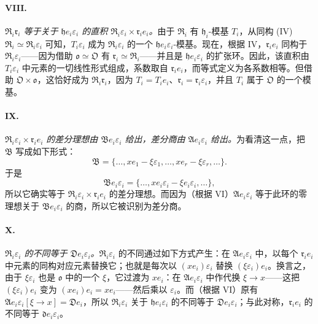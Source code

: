 \documentclass[11pt]{article}
\begin{document}
\paragraph{VIII.}
\emph{$\mathfrak R_i\mathfrak r_i$ 等于关于 $\mathfrak h e_i\varepsilon_i$ 的直积 $\mathfrak R_i\varepsilon_i\times\mathfrak r_i e_i$。}由于 $\mathfrak R_i$ 有 $\mathfrak h_i$-模基 $T_i$，从同构 (IV) $\mathfrak R_i\simeq\mathfrak R_i\varepsilon_i$ 可知，$T_i\varepsilon_i$ 成为 $\mathfrak R_i\varepsilon_i$ 的一个 $\mathfrak h e_i\varepsilon_i$-模基。现在，根据 IV，$\mathfrak r_i e_i$ 同构于 $\mathfrak R_i\varepsilon_i$——因为借助 $\mathfrak o\simeq\mathfrak O$ 有 $\mathfrak r_i\simeq\mathfrak R_i$——并且是 $\mathfrak h e_i\varepsilon_i$ 的扩张环。因此，该直积由 $T_i\varepsilon_i$ 中元素的一切线性形式组成，系数取自 $\mathfrak r_i e_i$，而等式定义为各系数相等。但借助 $\mathfrak O\times\mathfrak o$，这恰好成为 $\mathfrak R_i\mathfrak r_i$，因为 $T_i=T_i e_i$、$\mathfrak r_i=\mathfrak r_i\varepsilon_i$，并且 $T_i$ 属于 $\mathfrak O$ 的一个模基。

\paragraph{IX.}
\emph{$\mathfrak R_i\varepsilon_i\times\mathfrak r_i e_i$ 的差分理想由 $\mathfrak B e_i\varepsilon_i$ 给出，差分商由 $\mathfrak A e_i\varepsilon_i$ 给出。}为看清这一点，把 $\mathfrak B$ 写成如下形式：
\[
\mathfrak B=\{\ldots,xe_1-\xi\varepsilon_1,\ldots,xe_r-\xi\varepsilon_r,\ldots\}.
\]
于是
\[
\mathfrak B e_i\varepsilon_i
=\{\ldots,xe_i\varepsilon_i-\xi e_i\varepsilon_i,\ldots\},
\]
所以它确实等于 $\mathfrak R_i\varepsilon_i\times\mathfrak r_i e_i$ 的差分理想。而因为（根据 VI）$\mathfrak A e_i\varepsilon_i$ 等于此环的零理想关于 $\mathfrak B e_i\varepsilon_i$ 的商，所以它被识别为差分商。

\paragraph{X.}
\emph{$\mathfrak R_i\varepsilon_i$ 的不同等于 $\mathfrak D e_i\varepsilon_i$。}$\mathfrak R_i\varepsilon_i$ 的不同通过如下方式产生：在 $\mathfrak A e_i\varepsilon_i$ 中，以每个 $\mathfrak r_i e_i$ 中元素的同构对应元素替换它；也就是每次以 $(xe_i)\varepsilon_i$ 替换 $(\xi\varepsilon_i)e_i$。换言之，由于 $\xi\varepsilon_i$ 也是 $\mathfrak o$ 中的一个 $\xi$，它过渡为 $xe_i$：在 $\mathfrak A e_i\varepsilon_i$ 中作代换 $\xi\to x$——这把 $(\xi\varepsilon_i)e_i$ 变为 $(xe_i)e_i=xe_i$——然后乘以 $\varepsilon_i$。而（根据 VI）原有 $\mathfrak A e_i\varepsilon_i[\xi\to x]=\mathfrak D e_i$，所以 $\mathfrak R_i\varepsilon_i$ 关于 $\mathfrak h e_i\varepsilon_i$ 的不同等于 $\mathfrak D e_i\varepsilon_i$；与此对称，$\mathfrak r_i e_i$ 的不同等于 $\mathfrak d e_i\varepsilon_i$。
\end{document}
